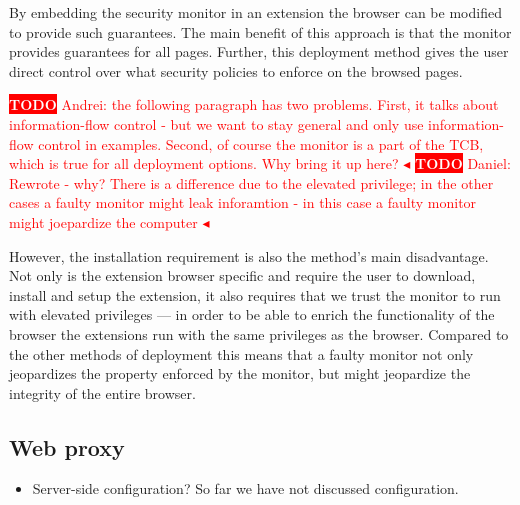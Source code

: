 \documentclass{llncs}
\newcommand{\todo}[1]{\colorbox{red}{\textcolor{white}{\sffamily\bfseries\scriptsize TODO}} \textcolor{red}{#1} \textcolor{red}{$\blacktriangleleft$}}
\begin{document}
By embedding the security monitor in an extension the browser can be modified
to provide such guarantees. The main benefit of this approach is that the
monitor provides guarantees for all pages. Further, this deployment method
gives the user direct control over what security policies to enforce on the
browsed pages.

\todo{Andrei: the following paragraph has two problems. First, it
  talks about information-flow control - but we want to stay general
  and only use information-flow control in examples. Second, of course
the monitor is a part of the TCB, which is true for all deployment
options. Why bring it up here?}
\todo{Daniel: Rewrote - why? There is a difference due to the elevated privilege; in the
  other cases a faulty monitor might leak inforamtion - in this case a faulty
  monitor might joepardize the computer}

However, the installation requirement is also the method's main disadvantage.
Not only is the extension browser specific and require the user to download,
install and setup the extension, it also requires that we trust the monitor to
run with elevated privileges --- in order to be able to enrich the
functionality of the browser the extensions run with the same privileges as the
browser. Compared to the other methods of deployment this means that a faulty
monitor not only jeopardizes the property enforced by the monitor, but might
jeopardize the integrity of the entire browser.


\subsection{Web proxy}

\begin{itemize}
\item Server-side configuration? So far we have not discussed configuration.
\end{itemize}
\end{document}
